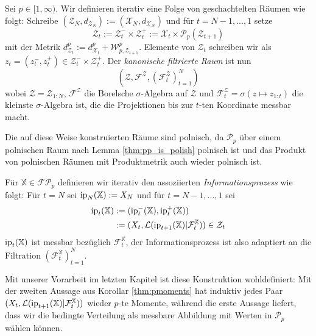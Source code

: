 \begin{definition}
    Sei $p \in [1, \infty)$. Wir definieren iterativ eine Folge von geschachtelten Räumen wie folgt: Schreibe $(\mathcal{Z}_N, d_{\mathcal{Z}_N}) := (\mathcal{X}_N, d_{\mathcal{X}_N})$ und für $t=N-1, ..., 1$ setze
    \begin{equation}
        \mathcal{Z}_t := \mathcal{Z}_t^- \times \mathcal{Z}_t^+ := \mathcal{X}_t \times \mathcal{P}_p(\mathcal{Z}_{t+1})
    \end{equation}
    mit der Metrik $d^p_{\mathcal{Z}_t} := d^p_{\mathcal{X}_t} + \mathcal{W}^p_{p, \mathcal{Z}_{t+1}}$. Elemente von $\mathcal{Z}_t$ schreiben wir als $z_t=(z_t^-, z_t^+) \in \mathcal{Z}_t^- \times \mathcal{Z}_t^+$. Der \emph{kanonische filtrierte Raum} ist nun
    \begin{equation}
        (\mathcal{Z}, \mathcal{F}^\mathcal{Z}, (\mathcal{F}_t^\mathcal{Z})_{t=1}^N)
    \end{equation}
    wobei $\mathcal{Z} = \mathcal{Z}_{1:N}$, $\mathcal{F}^\mathcal{Z}$ die Borelsche $\sigma$-Algebra auf $\mathcal{Z}$ und $\mathcal{F}^\mathcal{Z}_t=\sigma(z \mapsto z_{1:t})$ die kleinste $\sigma$-Algebra ist, die die Projektionen bis zur $t$-ten Koordinate messbar macht.
\end{definition}
Die auf diese Weise konstruierten Räume sind polnisch, da $\mathcal{P}_p$ über einem polnischen Raum nach Lemma \ref{thm:pp_is_polish} polnisch ist und das Produkt von polnischen Räumen mit Produktmetrik auch wieder polnisch ist. 
\begin{definition}
Für $\mathbb{X}\in \mathcal{FP}_p$ definieren wir iterativ den assoziierten \emph{Informationsprozess} wie folgt: Für $t=N$ sei $\operatorname{ip}_N(\mathbb{X}):=X_N$ und für $t=N-1,...,1$ sei
\begin{align*}
   \operatorname{ip}_t(\mathbb{X})&:=(\operatorname{ip}_t^-(\mathbb{X}), \operatorname{ip}_t^+(\mathbb{X})) \\
   &:= (X_t, \mathcal{L}(\operatorname{ip}_{t+1}(\mathbb{X}) \vert \mathcal{F}_t^{\mathbb{X}})) \in \mathcal{Z}_t
\end{align*}
$\operatorname{ip}_t(\mathbb{X})$ ist messbar bezüglich $\mathcal{F}_t^\mathbb{X}$, der Informationsprozess ist also adaptiert an die Filtration $\left(\mathcal{F}_t^\mathbb{X}\right)_{t=1}^N$.
\end{definition}
\begin{remark}
Mit unserer Vorarbeit im letzten Kapitel ist diese Konstruktion wohldefiniert: Mit der zweiten Aussage aus Korollar \ref{thm:pmoments} hat induktiv jedes Paar $(X_t, \mathcal{L}(\operatorname{ip}_{t+1}(\mathbb{X})\vert \mathcal{F}_t^\mathbb{X}))$ wieder $p$-te Momente, während die erste Aussage liefert, dass wir die bedingte Verteilung als messbare Abbildung mit Werten in $\mathcal{P}_p$ wählen können.
\end{remark}
